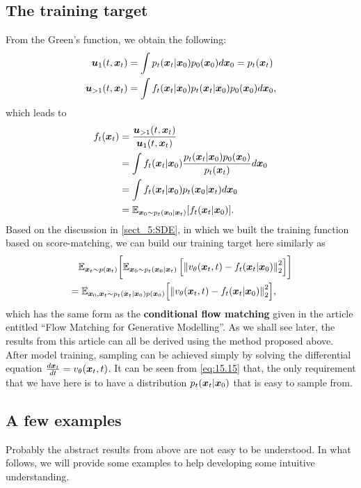 \subsection{The training target}
From the Green's function, we obtain the following:
\begin{align}
    \bm{u}_{1}(t,\bm{x}_{t})&=\int p_t (\bm{x}_{t}|\bm{x}_0) p_0(\bm{x}_0)d\bm{x}_0 = p_t(\bm{x}_{t})\nonumber\\
    \bm{u}_{>1}(t,\bm{x}_{t})&=\int f_t(\bm{x}_{t}|\bm{x}_0)p_t (\bm{x}_{t}|\bm{x}_0) p_0(\bm{x}_0)d\bm{x}_0, \label{eq:15.13}
\end{align}
which leads to
\begin{align}
    f_t(\bm{x}_{t}) &= \frac{\bm{u}_{>1}(t,\bm{x}_{t})}{\bm{u}_{1}(t,\bm{x}_{t})} \nonumber\\
    &=\int f_t (\bm{x}_{t}|\bm{x}_0)\frac{p_t (\bm{x}_{t}|\bm{x}_0) p_0(\bm{x}_0)}{p_t(\bm{x}_{t})}d\bm{x}_0\nonumber\\
    &=\int f_t (\bm{x}_{t}|\bm{x}_0) p_t(\bm{x}_0|\bm{x}_{t})d\bm{x}_0 \nonumber\\
    &=\mathbb{E}_{\bm{x}_0\sim p_t(\bm{x}_0|\bm{x}_{t})}[f_t(\bm{x}_{t}|\bm{x}_0)].\label{eq:15.14}
\end{align}
Based on the discussion in \cref{sect_5:SDE}, in which we built the training function based on score-matching, we can build our training target here similarly as
\begin{align}
    &\quad\mathbb{E}_{\bm{x}_{t}\sim p(\bm{x}_{t})}\biggl[ \mathbb{E}_{\bm{x}_0\sim p_t(\bm{x}_0|\bm{x}_{t})}\left[\left\|v_\theta(\bm{x}_{t},t)-f_t(\bm{x}_{t}|\bm{x}_0) \right\|_2^2\right]\biggr] \nonumber\\
    &=\mathbb{E}_{\bm{x}_0,\bm{x}_{t}\sim p_t (\bm{x}_{t}|\bm{x}_0)p(\bm{x}_0)}\Bigl[ \left\|v_\theta(\bm{x}_{t},t)-f_t(\bm{x}_{t}|\bm{x}_0) \right\|_2^2\Bigr],\label{eq:15.15}
\end{align}
which has the same form as the \textbf{conditional flow matching} given in the article entitled ``Flow Matching for Generative Modelling''\cite{lipman2022flow}. As we shall see later, the results from this article can all be derived using the method proposed above. After model training, sampling can be achieved simply by solving the differential equation $\frac{d\bm{x}_{t}}{dt}=v_\theta(\bm{x}_{t},t)$. It can be seen from \cref{eq:15.15} that, the only requirement that we have here is to have a distribution $p_t(\bm{x}_{t}|\bm{x}_0)$ that is easy to sample from.

\subsection{A few examples}

Probably the abstract results from above are not easy to be understood. In what follows, we will provide some examples to help developing some intuitive understanding.

